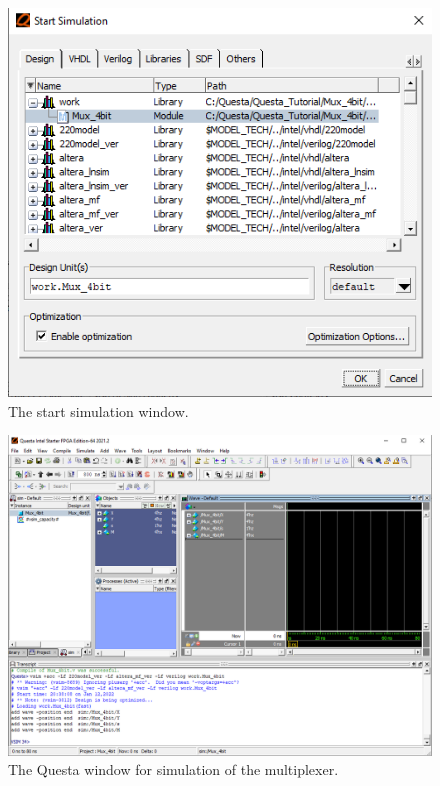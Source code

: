 \documentclass[11pt, twoside, pdftex]{article}
\begin{document}
\begin{figure}[H]
   \begin{center}
      \includegraphics[scale=0.70]{figures/mux_start_sim.png}
   \caption{The start simulation window.} 
	 \label{fig:mux_start_sim}
	 \end{center}
\end{figure}

\begin{figure}[H]
   \begin{center}
      \includegraphics[width=.95\textwidth]{figures/mux_main.png}
   \caption{The Questa window for simulation of the multiplexer.} 
	 \label{fig:mux_main}
	 \end{center}
\end{figure}
\end{document}
